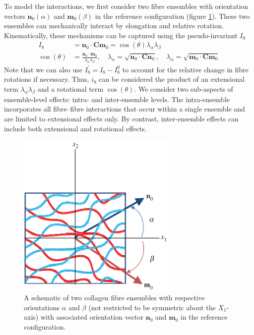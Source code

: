     
    To model the interactions, we first consider two fibre ensembles with orientation vectors $\mathbf{n}_0(\alpha)$ and $\mathbf{m}_0(\beta)$ in the reference configuration (figure \ref{c3:fig:7}). These two ensembles can mechanically interact by elongation and relative rotation. Kinematically, these mechanisms can be captured using the pseudo-invariant $I_8$ \cite{holzapfel_nonlinear_2000,merodio_influence_2006} 
        \begin{equation}\label{c3:eqn:49}
        \begin{aligned}
        I_8 &= \mathbf{n}_0\cdot\mathbf{C}\mathbf{m}_0 = \cos(\theta)\lambda_\alpha\lambda_\beta \\
        \cos(\theta) &= \frac{\mathbf{n}_0\cdot\mathbf{m}_0}{\lambda_\alpha\lambda_\beta}, \quad \lambda_\alpha=\sqrt{\mathbf{n}_0\cdot\mathbf{C}\mathbf{n}_0}, \quad \lambda_\alpha=\sqrt{\mathbf{m}_0\cdot\mathbf{C}\mathbf{m}_0} 
        \end{aligned}
        \end{equation}
    Note that we can also use $I_8^\prime = I_8  - I_8^0$ \cite{merodio_influence_2006} to account for the relative change in fibre rotations if necessary. Thus, $i_8$ can be considered the product of an extensional term $\lambda_\alpha \lambda_\beta$ and a rotational term $\cos(\theta)$. We consider two sub-aspects of ensemble-level effects: intra- and inter-ensemble levels. The intra-ensemble incorporates all fibre–fibre interactions that occur within a single ensemble and are limited to extensional effects only. By contrast, inter-ensemble effects can include both extensional and rotational effects.
    
    
\begin{figure}
\centering
\includegraphics[width=3in]{Images/chapter3/F7large.jpg}
\caption{A schematic of two collagen fibre ensembles with respective orientations $\alpha$ and $\beta$ (not restricted to be symmetric about the $X_1$-axis) with associated orientation vector $\mathbf{n}_0$ and $\mathbf{m}_0$ in the reference configuration.}
\label{c3:fig:7}
\end{figure}
    
